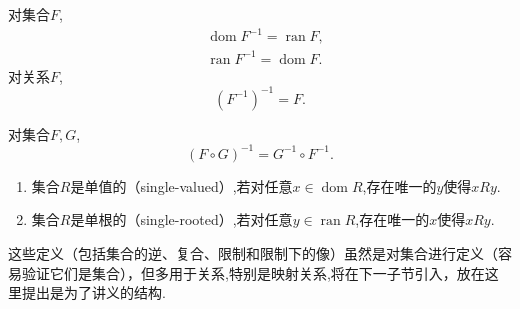\begin{theorem}
    [逆的定义域和值域]
        对集合$F$,
        \begin{align*}
            &\operatorname{dom}F^{-1}=\operatorname{ran}F,\\
            &\operatorname{ran}F^{-1}=\operatorname{dom}F.  
        \end{align*}
        对关系$F$,
        \[\left(F^{-1}\right)^{-1}=F.\]
\end{theorem}

\begin{theorem}
    [逆和复合的操作顺序]
    对集合$F,G$,
    \[(F\circ G)^{-1}=G^{-1}\circ F^{-1}.\]
\end{theorem}

\begin{definition}
    [集合的单根性和单值性]

    \begin{enumerate}
        \item 集合$R$是单值的（single-valued）,若对任意$x\in \operatorname{dom}R$,存在唯一的$y$使得$xRy.$
        \item 集合$R$是单根的（single-rooted）,若对任意$y\in \operatorname{ran}R$,存在唯一的$x$使得$xRy$.
\end{enumerate}
\end{definition}
这些定义（包括集合的逆、复合、限制和限制下的像）虽然是对集合进行定义（容易验证它们是集合），但多用于关系,特别是映射关系,将在下一子节引入，放在这里提出是为了讲义的结构.